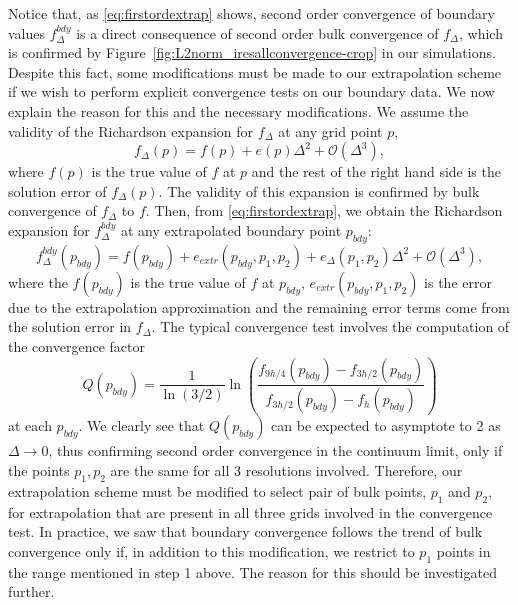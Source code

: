 \documentclass[a4paper,11pt]{article}
\numberwithin{equation}{section}
\begin{document}
Notice that, as \eqref{eq:firstordextrap} shows, second order convergence of boundary values $f^{bdy}_{\Delta}$ is a direct consequence of second order bulk convergence of $f_\Delta$, which is confirmed by Figure~\ref{fig:L2norm_iresallconvergence-crop} in our simulations. Despite this fact, some modifications must be made to our extrapolation scheme if we wish to perform explicit convergence tests on our boundary data. We now explain the reason for this and the necessary modifications. We assume the validity of the Richardson expansion \cite{doi:10.1098/rsta.1911.0009} for $f_{\Delta}$ at any grid point $p$,
\begin{equation}
\label{eq:Richexp}
f_\Delta(p)=f(p)+e(p)\Delta^2+\mathcal{O}(\Delta^3),
\end{equation}
where $f(p)$ is the true value of $f$ at $p$ and the rest of the right hand side is the solution error of $f_\Delta(p)$. The validity of this expansion is confirmed by bulk convergence of $f_\Delta$ to $f$.
Then, from \eqref{eq:firstordextrap}, we obtain the Richardson expansion for $f^{bdy}_{\Delta}$ at any extrapolated boundary point $p_{bdy}$:
 \begin{equation}
 \label{eq:bdyRichexp}
 f^{bdy}_{\Delta}(p_{bdy})=f(p_{bdy})+e_{extr}(p_{bdy},p_1,p_2)+e_\Delta(p_1,p_2)\Delta^2+\mathcal{O}(\Delta^3),
 \end{equation}
where the $f(p_{bdy})$ is the true value of $f$ at $p_{bdy}$, $e_{extr}(p_{bdy},p_1,p_2)$ is the error due to the extrapolation approximation and the remaining error terms come from the solution error in $f_\Delta$. The typical  convergence test involves the computation of the convergence factor
\begin{equation}\label{eq:qconv}
Q(p_{bdy})=\frac{1}{\ln(3/2)}\ln\left( \frac{f_{9h/4}(p_{bdy})-f_{3h/2}(p_{bdy})}{f_{3h/2}(p_{bdy})-f_{h}(p_{bdy})} \right)
\end{equation}
at each $p_{bdy}$. We clearly see that $Q(p_{bdy})$ can be expected to asymptote to 2 as $\Delta\rightarrow0$, thus confirming second order convergence in the continuum limit, only if the points $p_1,p_2$ are the same for all 3 resolutions involved. Therefore, our extrapolation scheme must be modified to select pair of bulk points, $p_1$ and $p_2$, for extrapolation that are present in all three grids involved in the convergence test. 
In practice, we saw that boundary convergence follows the trend of bulk convergence only if, in addition to this modification, we restrict to $p_1$ points in the range mentioned in step 1 above. The reason for this should be investigated further. 
\end{document}
